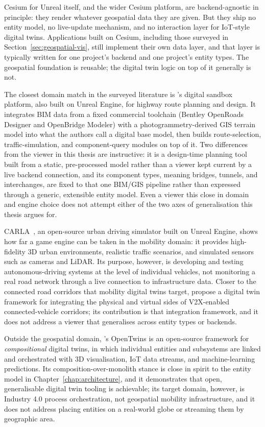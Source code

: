 Cesium for Unreal itself, and the wider Cesium platform, are backend-agnostic in principle: they render whatever geospatial data they are given. But they ship no entity model, no live-update mechanism, and no interaction layer for IoT-style digital twins. Applications built on Cesium, including those surveyed in Section~\ref{sec:geospatial-vis}, still implement their own data layer, and that layer is typically written for one project's backend and one project's entity types. The geospatial foundation is reusable; the digital twin logic on top of it generally is not.

The closest domain match in the surveyed literature is \textcite{lv2024highwaysandbox}'s digital sandbox platform, also built on Unreal Engine, for highway route planning and design. It integrates BIM data from a fixed commercial toolchain (Bentley OpenRoads Designer and OpenBridge Modeler) with a photogrammetry-derived GIS terrain model into what the authors call a digital base model, then builds route-selection, traffic-simulation, and component-query modules on top of it. Two differences from the viewer in this thesis are instructive: it is a design-time planning tool built from a static, pre-processed model rather than a viewer kept current by a live backend connection, and its component types, meaning bridges, tunnels, and interchanges, are fixed to that one BIM/GIS pipeline rather than expressed through a generic, extensible entity model. Even a viewer this close in domain and engine choice does not attempt either of the two axes of generalisation this thesis argues for.

CARLA~\cite{dosovitskiy2017carla}, an open-source urban driving simulator built on Unreal Engine, shows how far a game engine can be taken in the mobility domain: it provides high-fidelity 3D urban environments, realistic traffic scenarios, and simulated sensors such as cameras and LiDAR. Its purpose, however, is developing and testing autonomous-driving systems at the level of individual vehicles, not monitoring a real road network through a live connection to infrastructure data. Closer to the connected road corridors that mobility digital twins target, \textcite{wu2025v2xdigitaltwin} propose a digital twin framework for integrating the physical and virtual sides of V2X-enabled connected-vehicle corridors; its contribution is that integration framework, and it does not address a viewer that generalises across entity types or backends.

Outside the geospatial domain, \textcite{robles2023opentwins}'s OpenTwins is an open-source framework for \emph{compositional} digital twins, in which individual entities and subsystems are linked and orchestrated with 3D visualisation, IoT data streams, and machine-learning predictions. Its composition-over-monolith stance is close in spirit to the entity model in Chapter~\ref{chap:architecture}, and it demonstrates that open, generalisable digital twin tooling is achievable; its target domain, however, is Industry 4.0 process orchestration, not geospatial mobility infrastructure, and it does not address placing entities on a real-world globe or streaming them by geographic area.


